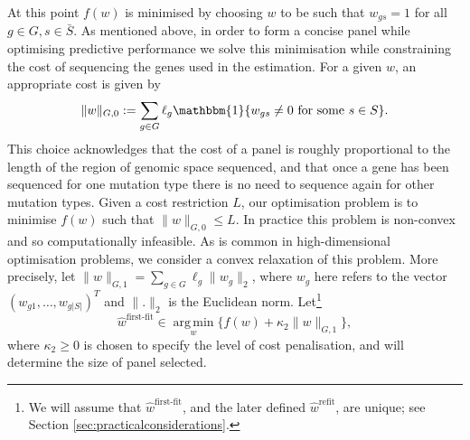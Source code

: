 \documentclass[12pt]{article}
\DeclareMathOperator*{\argmin}{arg\,min}
\begin{document}
At this point $f(w)$ is minimised by choosing $w$ to be such that $w_{gs}= 1$ for all $g\in G, s\in\bar{S}$. As mentioned above, in order to form a concise panel while optimising predictive performance we solve this minimisation while constraining the cost of sequencing the genes used in the estimation. For a given $w$, an appropriate cost is given by
\[
\|w\|_{G,0} := \sum_{g \in G} \ell_g\mathbbm{1}\{w_{gs} \neq 0 \ \mathrm{for \ some \ } s \in S \} .
\]
This choice acknowledges that the cost of a panel is roughly proportional to the length of the region of genomic space sequenced, and that once a gene has been sequenced for one mutation type there is no need to sequence again for other mutation types. Given a cost restriction $L$, our optimisation problem is to minimise $f(w)$ such that $\|w\|_{G,0} \leq L$. In practice this problem is non-convex and so computationally infeasible. As is common in high-dimensional optimisation problems, we consider a convex relaxation of this problem.  More precisely, let $\|w\|_{G,1} = \sum_{g \in G} \ell_g \|w_g\|_2$, where $w_g$ here refers to the vector $(w_{g1}, \ldots, w_{g|S|})^T$ and $\|.\|_2$ is the Euclidean norm.  Let\footnote{We will assume that $\hat{w}^{\text{first-fit}}$, and the later defined $\hat{w}^{\text{refit}}$, are unique; see Section \ref{sec:practicalconsiderations}.}
\begin{equation}
    \label{eq:wfirstfit}
\hat{w}^{\text{first-fit}} \in \argmin\limits_{w} \bigl\{ f(w) +\kappa_2\|w\|_{G,1} \bigr\},
\end{equation}
where $\kappa_2 \geq 0$ is chosen to specify the level of cost penalisation, and will determine the size of panel selected.
\end{document}
